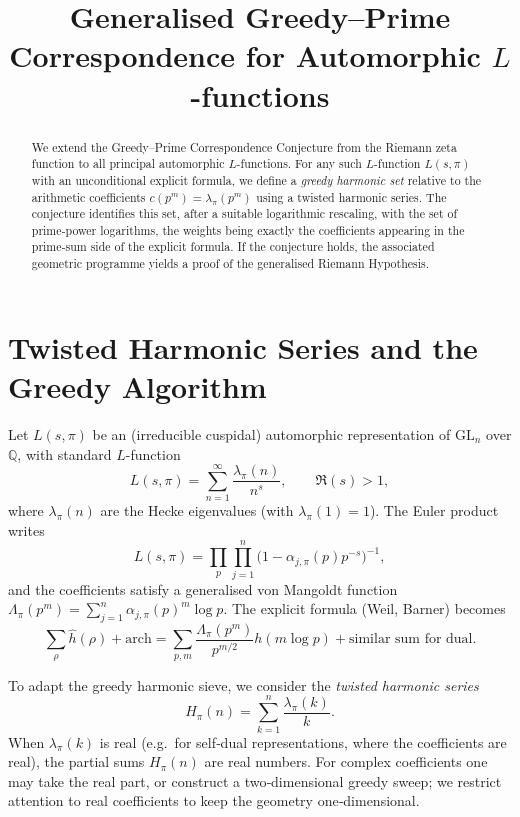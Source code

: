 \documentclass[12pt,a4paper]{article}
\title{Generalised Greedy--Prime Correspondence for Automorphic \(L\)-functions}
\author{}
\date{}
\newcommand{\Q}{\mathbb{Q}}
\begin{document}
\maketitle

\begin{abstract}
We extend the Greedy--Prime Correspondence Conjecture from the Riemann zeta function to all principal automorphic \(L\)-functions.  For any such \(L\)-function \(L(s,\pi)\) with an unconditional explicit formula, we define a \emph{greedy harmonic set} relative to the arithmetic coefficients \(c(p^m)=\lambda_\pi(p^m)\) using a twisted harmonic series.  The conjecture identifies this set, after a suitable logarithmic rescaling, with the set of prime‑power logarithms, the weights being exactly the coefficients appearing in the prime‑sum side of the explicit formula.  If the conjecture holds, the associated geometric programme yields a proof of the generalised Riemann Hypothesis.
\end{abstract}

\section{Twisted Harmonic Series and the Greedy Algorithm}
Let \(L(s,\pi)\) be an (irreducible cuspidal) automorphic representation of \(\mathrm{GL}_n\) over \(\Q\), with standard \(L\)-function
\[
L(s,\pi)=\sum_{n=1}^{\infty}\frac{\lambda_\pi(n)}{n^{s}},\qquad \Re(s)>1,
\]
where \(\lambda_\pi(n)\) are the Hecke eigenvalues (with \(\lambda_\pi(1)=1\)).  The Euler product writes
\[
L(s,\pi)=\prod_{p}\prod_{j=1}^{n}\bigl(1-\alpha_{j,\pi}(p)p^{-s}\bigr)^{-1},
\]
and the coefficients satisfy a generalised von Mangoldt function \(\Lambda_\pi(p^m)=\sum_{j=1}^{n}\alpha_{j,\pi}(p)^m\log p\).  The explicit formula (Weil, Barner) becomes
\[
\sum_{\rho}\widehat{h}(\rho)+\text{arch}=\sum_{p,m}\frac{\Lambda_\pi(p^m)}{p^{m/2}}h(m\log p)+\text{similar sum for dual}.
\]

To adapt the greedy harmonic sieve, we consider the \emph{twisted harmonic series}
\[
H_\pi(n)=\sum_{k=1}^{n}\frac{\lambda_\pi(k)}{k}.
\]
When \(\lambda_\pi(k)\) is real (e.g.\ for self‑dual representations, where the coefficients are real), the partial sums \(H_\pi(n)\) are real numbers.  For complex coefficients one may take the real part, or construct a two‑dimensional greedy sweep; we restrict attention to real coefficients to keep the geometry one‑dimensional.
\end{document}
